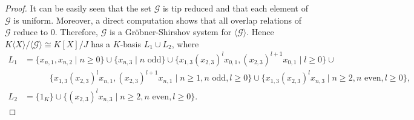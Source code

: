 \documentclass[10pt, reqno]{amsart}
\theoremstyle{definition}
\theoremstyle{remark}
\numberwithin{equation}{section}
\begin{document}
\begin{proof}
It can be easily seen that the set \(\mathscr{G}\) is tip reduced and that each element of \(\mathscr{G}\) is uniform.
Moreover, a direct computation shows that all overlap relations of \(\mathscr{G}\) reduce to \(0\). Therefore, \(\mathscr{G}\) is a Gr\"obner-Shirshov system for \(\langle\mathscr{G}\rangle\).
Hence \(K\langle X \rangle /\langle\mathscr{G}\rangle \cong K[X]/J\) has a  $K$-basis $L_1 \cup L_2$, where
$$\begin{aligned}
    L_1 &=\{x_{n,1}, x_{n,2}\mid n\ge 0\} \cup \{x_{n,3}\mid n \text{ odd}\}\cup\{x_{1,3}(x_{2,3})^lx_{0,1}, (x_{2,3})^{l+1}x_{0,1}\mid l\ge 0\}\cup\\
& \quad\quad\quad \{x_{1,3}(x_{2,3})^l x_{n,1},  (x_{2,3})^{l+1} x_{n,1} \mid n \ge 1, n\text{ odd}, l \ge 0\} \cup \{x_{1,3}(x_{2,3})^l x_{n,3} \mid n \ge 2, n\text{ even}, l \ge 0\},\\
L_2 &=\{1_K\}\cup\{(x_{2,3})^l x_{n,3}\mid n\ge2, n \text{ even}, l\ge0\}.
\end{aligned}$$

\end{proof}
\end{document}
